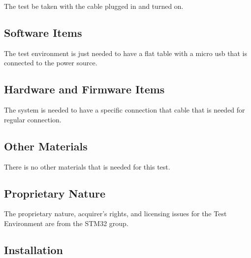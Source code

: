 


The test be taken with the cable plugged in and turned on. 

\subsection{Software Items}
\label{loc:Software\TestEnvName}


The test environment is just needed to have a flat table with a micro usb that is connected to the power source.

\subsection{Hardware and Firmware Items}
\label{loc:Hardware\TestEnvName}


The system is needed to have a specific connection that cable that is needed for regular connection.

\subsection{Other Materials}
\label{loc:OtherMaterials\TestEnvName}


There is no other materials that is needed for this test.

\subsection{Proprietary Nature}
\label{loc:ProprietaryNature\TestEnvName}


The proprietary nature, acquirer’s rights, and licensing issues for the \TestEnvName\xspace Test Environment are from the STM32 group.

\subsection{Installation}
\label{loc:Installation\TestEnvName}


